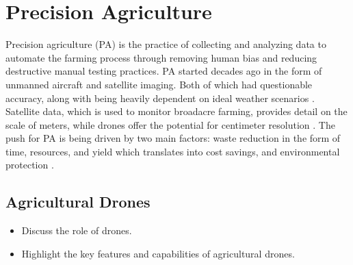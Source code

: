 \documentclass{IEEEtran}
\begin{document}

\section{Precision Agriculture}
Precision agriculture (PA) is the practice of collecting and analyzing data to automate the farming process through removing human bias and reducing destructive manual testing practices. PA started decades ago
in the form of unmanned aircraft and satellite imaging. Both of which had questionable accuracy, along with being heavily dependent on ideal weather scenarios \cite{key9}. Satellite data, which is used
to monitor broadacre farming, provides detail on the scale of meters, while drones offer the potential for centimeter resolution \cite{key8}. The push for PA is being driven by two main factors: waste reduction in the form
of time, resources, and yield which translates into cost savings, and environmental protection \cite{key9}.

\subsection{Agricultural Drones}
    \begin{itemize}
        \item Discuss the role of drones.
        \item Highlight the key features and capabilities of agricultural drones.
    \end{itemize}
\end{document}
